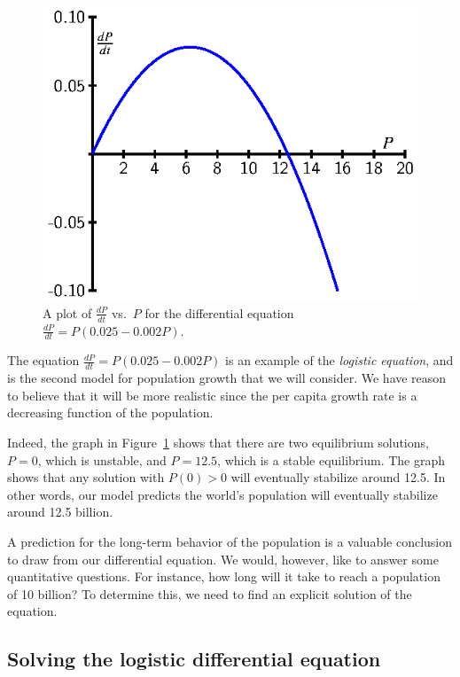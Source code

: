 \begin{figure}[h]
\begin{center}
  \includegraphics{figures/7_6_logistic_de.eps}
\end{center}
\caption{A plot of $\frac{dP}{dt}$ vs.~$P$ for the differential equation $\frac{dP}{dt} = P(0.025 - 0.002P)$.}\label{F:7.6.logistic}
\end{figure}
The equation $\frac{dP}{dt} = P(0.025 - 0.002P)$ is an example of the {\em logistic equation}, 
and is the second model for population growth that we will consider.  We
have reason to believe that it will be more realistic since the per
capita growth rate is a decreasing function of the population.

Indeed, the graph in Figure~\ref{F:7.6.logistic} shows that there are two equilibrium
solutions, $P=0$, which is unstable, and $P=12.5$, which is a stable
equilibrium.  The graph shows that any solution with $P(0) >0$ will
eventually stabilize around 12.5.  In other words, our model predicts
the world's population will eventually stabilize around 12.5
billion.

A prediction for the long-term behavior of the population is a
valuable conclusion to draw from our differential equation.  We would,
however, like to answer some quantitative questions.  For instance,
how long will it take to reach a population of 10 billion?  To determine this,
we need to find an explicit solution of the equation.  

\subsection*{Solving the logistic differential equation} 

